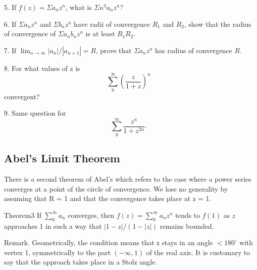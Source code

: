 5. If $f(z) = \Sigma a_{n}z^{n}$, what is $\Sigma n^{3}a_{n}z^{n}$?

6. If $\Sigma a_{n}z^{n}$ and $\Sigma b_{n}z^{n}$ have radii of convergence $R_{1}$ and $R_{2}$, show that the radius of convergence of $\Sigma a_{n}b_{n}z^{n}$ is at least $R_{1}R_{2}$.

7. If $\lim_{n\to \infty}|a_n| / |a_{n + 1}| = R$, prove that $\Sigma a_n z^n$ has radius of convergence $R$.

8. For what values of z is
\begin{equation*}
\sum_ {0} ^ {\infty} \left(\frac {z}{1 + z}\right) ^ {n}
\end{equation*}
convergent?

9. Same question for
\begin{equation*}
\sum_ {0} ^ {\infty} \frac {z ^ {n}}{1 + z ^ {2 n}}.
\end{equation*}
\setcounter{section}{2}\setcounter{subsection}{4}\subsection{Abel's Limit Theorem}\label{sec:2.2.5}
There is a second theorem of Abel's which refers to the case where a power series converges at a point of the circle of convergence. We lose no generality by assuming that R = 1 and that the convergence takes place at z = 1.

\begin{originalstatement}{Theorem}{3}\label{thm:2.3}
If $\sum_{0}^{\infty} a_n$ converges, then $f(z) = \sum_{0}^{\infty} a_n z^n$ tends to $f(1)$ as $z$ approaches 1 in such a way that $|1 - z| / (1 - |z|)$ remains bounded.
\end{originalstatement}
Remark. Geometrically, the condition means that z stays in an angle $<180^{\circ}$ with vertex 1, symmetrically to the part $(-\infty,1)$ of the real axis. It is customary to say that the approach takes place in a Stolz angle.


